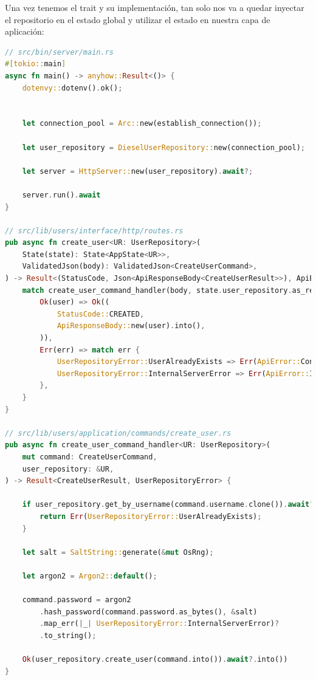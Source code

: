 Una vez tenemos el trait y su implementación, tan solo nos va a quedar inyectar el repositorio en el estado global y utilizar el estado en nuestra capa de aplicación:
\begin{lstlisting}[language=Rust, caption={Inyección del repositorio en el estado global y uso en el comando para crear un usuario}, label={lst:inject-repository}]
// src/bin/server/main.rs
#[tokio::main]
async fn main() -> anyhow::Result<()> {
    dotenvy::dotenv().ok();


    let connection_pool = Arc::new(establish_connection());

    let user_repository = DieselUserRepository::new(connection_pool);

    let server = HttpServer::new(user_repository).await?;

    server.run().await
}

// src/lib/users/interface/http/routes.rs
pub async fn create_user<UR: UserRepository>(
    State(state): State<AppState<UR>>,
    ValidatedJson(body): ValidatedJson<CreateUserCommand>,
) -> Result<(StatusCode, Json<ApiResponseBody<CreateUserResult>>), ApiError> {
    match create_user_command_handler(body, state.user_repository.as_ref()).await {
        Ok(user) => Ok((
            StatusCode::CREATED,
            ApiResponseBody::new(user).into(),
        )),
        Err(err) => match err {
            UserRepositoryError::UserAlreadyExists => Err(ApiError::ConflictError(err.to_string())),
            UserRepositoryError::InternalServerError => Err(ApiError::InternalServerError(err.to_string())),
        },
    }
}

// src/lib/users/application/commands/create_user.rs
pub async fn create_user_command_handler<UR: UserRepository>(
    mut command: CreateUserCommand,
    user_repository: &UR,
) -> Result<CreateUserResult, UserRepositoryError> {

    if user_repository.get_by_username(command.username.clone()).await?.is_some() {
        return Err(UserRepositoryError::UserAlreadyExists);
    }

    let salt = SaltString::generate(&mut OsRng);

    let argon2 = Argon2::default();

    command.password = argon2
        .hash_password(command.password.as_bytes(), &salt)
        .map_err(|_| UserRepositoryError::InternalServerError)?
        .to_string();

    Ok(user_repository.create_user(command.into()).await?.into())
}
\end{lstlisting}

